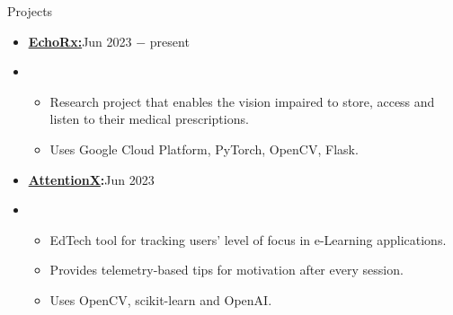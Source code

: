 \documentclass{resume}
\begin{document}
\vspace{-0.5\baselineskip}


\begin{rSection}{Projects}
      \begin{itemize}[label=\null, leftmargin=*, parsep=0.5em]
            \item {
                  \textbf{\href{https://github.com/AdwayB/EchoRx}{\underline{EchoRx}:}}\hfill Jun 2023 $-$ present
                  } \\
            \item {
                  \vspace{-1.2\baselineskip}
                  \begin{itemize}[label=$\bullet$]
                        \vspace{-\parskip}
                        \vspace{-\parsep}
                        \item {
                              Research project that enables the vision impaired to store, access and listen to their medical prescriptions.
                              }
                        \item {
                              Uses Google Cloud Platform, PyTorch, OpenCV, Flask.
                              }
                  \end{itemize}
                  }



            \item {
                  \textbf{\href{https://github.com/AdwayB/AttentionX}{ \underline{AttentionX}}:}\hfill Jun 2023
                  } \\
            \item {
                  \vspace{-1.2\baselineskip}
                  \begin{itemize}[label=$\bullet$]
                        \vspace{-\parskip}
                        \vspace{-\parsep}
                        \item {
                              EdTech tool for tracking users' level of focus in e-Learning applications.
                              }
                        \item {
                              Provides telemetry-based tips for motivation after every session.
                              }
                        \item {
                              Uses OpenCV, scikit-learn and OpenAI.\@
                              }
                  \end{itemize}
                  }




\end{itemize}
\end{rSection}
\end{document}
